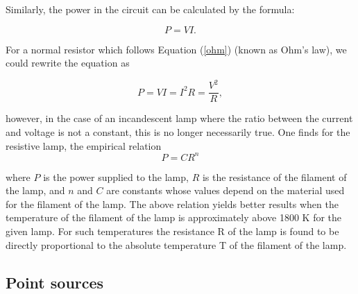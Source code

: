 \begin{refsection}






Similarly, the power in the circuit can be calculated by the formula: 

\begin{equation}
    P = V I.
\end{equation}

For a normal resistor which follows Equation (\ref{ohm}) (known as Ohm's law), we could rewrite the equation as 

\begin{equation*}
    P = VI = I^2 R = \frac{V^2}{R},
\end{equation*}

however, in the case of an incandescent lamp where the ratio between the current and voltage is not a constant, this is no longer necessarily true. One finds for the resistive lamp, the empirical relation
\begin{equation*}
P = C R^n
\end{equation*}

where $P$ is the power supplied to the lamp, $R$ is the resistance of the filament of the lamp, and $n$ and $C$ are constants whose values depend on the material used for the filament of the lamp. The above relation yields better results when the temperature of the filament of the lamp is approximately above 1800 K for the given lamp. For such temperatures the resistance R of the lamp is found to be directly proportional to the absolute temperature T of the filament of the lamp.



\subsection*{Point sources}



\end{refsection}
